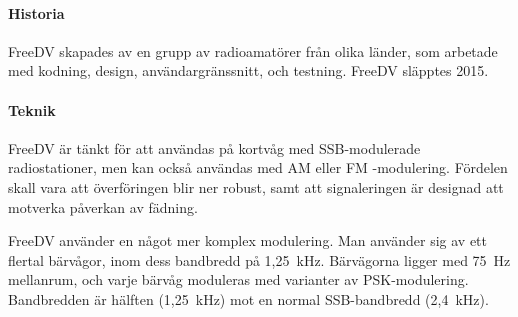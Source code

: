 \paragraph{Historia}

FreeDV skapades av en grupp av radioamatörer från olika länder, som arbetade
med kodning, design, användargränssnitt, och testning.
FreeDV släpptes 2015.

\paragraph{Teknik}

FreeDV är tänkt för att användas på kortvåg med SSB-modulerade radiostationer,
men kan också användas med AM eller FM -modulering. 
Fördelen skall vara att överföringen blir ner robust, samt att signaleringen är
designad att motverka påverkan av fädning.

FreeDV använder en något mer komplex modulering. 
Man använder sig av ett flertal bärvågor, inom dess bandbredd på 1,25~kHz. 
Bärvägorna ligger med 75~Hz mellanrum, och varje bärvåg moduleras med varianter
av PSK-modulering.
Bandbredden är hälften (1,25~kHz)  mot en normal SSB-bandbredd (2,4~kHz).
